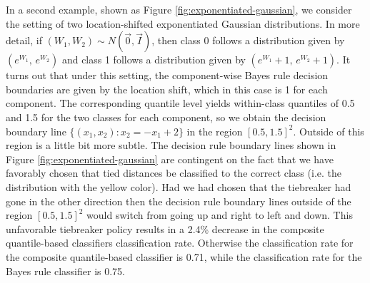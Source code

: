 In a second example, shown as Figure \ref{fig:exponentiated-gaussian}, we
consider the setting of two location-shifted exponentiated Gaussian
distributions.  In more detail, if $(W_1, W_2) \sim N(\vec{0}, \vec{I})$, then
class 0 follows a distribution given by $(e^{W_1},\, e^{W_2})$ and class 1
follows a distribution given by $(e^{W_1} + 1,\, e^{W_2} + 1)$.  It turns out
that under this setting, the component-wise Bayes rule decision boundaries are
given by the location shift, which in this case is 1 for each component.  The
corresponding quantile level yields within-class quantiles of 0.5 and 1.5 for
the two classes for each component, so we obtain the decision boundary line
$\{(x_1, x_2) : x_2 = -x_1 + 2\}$ in the region $[0.5, 1.5]^2$.  Outside of this
region is a little bit more subtle.  The decision rule boundary lines shown in
Figure \ref{fig:exponentiated-gaussian} are contingent on the fact that we have
favorably chosen that tied distances be classified to the correct class
(i.e. the distribution with the yellow color).  Had we had chosen that the
tiebreaker had gone in the other direction then the decision rule boundary lines
outside of the region $[0.5, 1.5]^2$ would switch from going up and right to
left and down.  This unfavorable tiebreaker policy results in a 2.4\% decrease
in the composite quantile-based classifiers classification rate.  Otherwise the
classification rate for the composite quantile-based classifier is 0.71, while
the classification rate for the Bayes rule classifier is 0.75.


